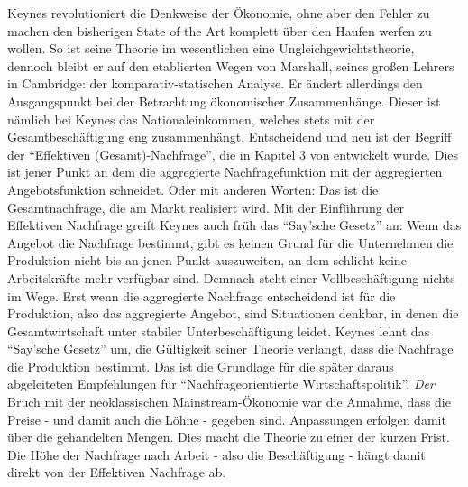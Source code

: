 Keynes revolutioniert die Denkweise der Ökonomie, ohne aber den Fehler zu machen den bisherigen State of the Art komplett über den Haufen werfen zu wollen. So ist seine Theorie im wesentlichen eine Ungleichgewichtstheorie, dennoch bleibt er auf den etablierten Wegen von Marshall, seines großen Lehrers in Cambridge: der komparativ-statischen Analyse. Er ändert allerdings den Ausgangspunkt bei der Betrachtung ökonomischer Zusammenhänge. Dieser ist nämlich bei Keynes das Nationaleinkommen, welches stets mit der Gesamtbeschäftigung eng zusammenhängt. Entscheidend und neu ist der Begriff der "`Effektiven (Gesamt)-Nachfrage"', die in Kapitel 3 von \textcite[S. 25]{Keynes1936} entwickelt wurde. Dies ist jener Punkt an dem die aggregierte Nachfragefunktion mit der aggregierten Angebotsfunktion schneidet. Oder mit anderen Worten: Das ist die Gesamtnachfrage, die am Markt realisiert wird. Mit der Einführung der Effektiven Nachfrage greift Keynes auch früh das "`Say'sche Gesetz"' an: Wenn das Angebot die Nachfrage bestimmt, gibt es keinen Grund für die Unternehmen die Produktion nicht bis an jenen Punkt auszuweiten, an dem schlicht keine Arbeitskräfte mehr verfügbar sind. Demnach steht einer Vollbeschäftigung nichts im Wege. Erst wenn die aggregierte Nachfrage entscheidend ist für die Produktion, also das aggregierte Angebot, sind Situationen denkbar, in denen die Gesamtwirtschaft unter stabiler Unterbeschäftigung leidet. Keynes lehnt das "`Say'sche Gesetz"' um, die Gültigkeit seiner Theorie verlangt, dass die Nachfrage die Produktion bestimmt. Das ist die Grundlage für die später daraus abgeleiteten Empfehlungen für "`Nachfrageorientierte Wirtschaftspolitik"'. \textit{Der} Bruch mit der neoklassischen Mainstream-Ökonomie war die Annahme, dass die Preise - und damit auch die Löhne - gegeben sind\parencite[S. 58]{Snowdon2005}. Anpassungen erfolgen damit über die gehandelten Mengen. Dies macht die Theorie zu einer der kurzen Frist. Die Höhe der Nachfrage nach Arbeit - also die Beschäftigung - hängt damit direkt von der Effektiven Nachfrage ab.

